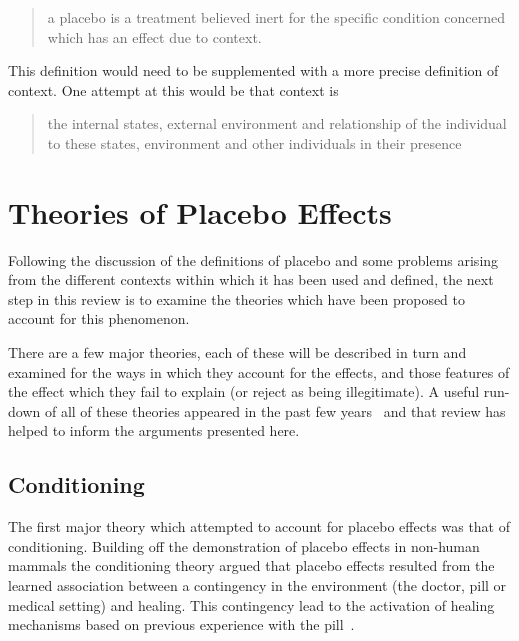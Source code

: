 \begin{quotation}
  a placebo is a treatment believed inert for the specific condition
  concerned which has an effect due to context.
\end{quotation}

This definition would need to be supplemented with a more precise definition of context. One attempt at this would be that context is

\begin{quotation}
   the internal states, external environment and relationship of the individual to these states, environment and other individuals in their presence 
\end{quotation}





\section{Theories of Placebo Effects}
\label{sec:theor-plac-effects}

Following the discussion of the definitions of placebo and some problems arising from the different contexts within which it has been used and defined, the next step in this review is to examine the theories which have been proposed to account for this phenomenon. 

There are a few major theories, each of these will be described in turn  and examined for the ways in which they account for the effects, and those features of the effect which they fail to explain (or reject as being illegitimate). A useful run-down of all of these theories appeared in the past few years~\cite{Stewart-Williams2004b} and that review has helped to inform the arguments presented here. 

\subsection{Conditioning}
\label{sec:conditioning}

The first major theory which attempted to account for placebo effects was that of conditioning. Building off the demonstration of placebo effects in non-human mammals \cite{Herrnstein1962} the conditioning theory argued that placebo effects resulted from the learned association between a contingency in the environment (the doctor, pill or medical setting) and healing. This contingency lead to the activation of healing mechanisms based on previous experience with the pill~\cite{Vodouris1989,Voudouris1985}.


